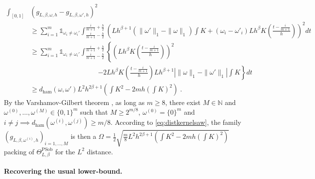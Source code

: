 \documentclass[10pt]{article} %
\def\Ind{\mathds{1}}
\newcommand{\N}[0]{\mathbb{N}}
\newcommand\ham[2]{d_\mathrm{ham}\left( {#1}, {#2} \right)}
\newcommand\p[1]{\left( {#1}\right)}
\newcommand\RG[1]{\textcolor{red}{#1}}
\begin{document}
\begin{equation}
\label{eq:distkernelsaw}
\begin{aligned}
    \int_{[0, 1]} &\p{g_{L, \beta, \omega, h} - g_{L, \beta, \omega', h}}^2 \\
    &\geq
    \sum_{i=1}^m \Ind_{\omega_i \neq \omega_i'} \int_{\frac{i}{m+1} - \frac{h}{2}}^{\frac{i}{m+1} + \frac{h}{2}}
    \p{L h^{\beta + 1} \p{\| \omega' \|_1 - \| \omega \|_1} \int K +(\omega_i-\omega'_i) L h^{\beta } K\p{\frac{t-\frac{i}{m+1} }{h}}}^2 dt\\
    &\geq
    \sum_{i=1}^m \Ind_{\omega_i \neq \omega_i'} \int_{\frac{i}{m+1} - \frac{h}{2}}^{\frac{i}{m+1} + \frac{h}{2}}
    \left\{\p{L h^{\beta } K\p{\frac{t-\frac{i}{m+1}}{h}}}^2 \right.\\
    &\quad\quad\quad\quad\quad\quad\quad\quad\quad\quad \left.- 2 L h^{\beta } K\p{\frac{t-\frac{i}{m+1}}{h}} L h^{\beta + 1} \left|\| \omega \|_1 - \| \omega' \|_1\right| \int K \right\} dt\\ 
    &\geq
    \ham{\omega}{\omega '} L^2h^{2 \beta + 1}\p{  \int K^2 - 2m h \p{\int K}^2} \;.
\end{aligned}
\end{equation}
By the Varshamov-Gilbert theorem \citep[Lemma 2.7]{tsybakov2003introduction}, as long as $m \geq 8$, there exist $M \in \N$ and $\omega^{(0)}, \dots, \omega^{(M)} \in \{ 0, 1 \}^m$ such that $M \geq 2^{m/8}$, $\omega^{(0)} = \{0\}^m$ and $i \neq j \implies \ham{\omega^{(i)}}{\omega^{(j)}} \geq m/8$. According to \eqref{eq:distkernelsaw}, the family $\p{g_{L, \beta, \omega^{(i)}, h}}_{i=1, \dots, M}$ is then a $\Omega = \frac{1}{2} \sqrt{\frac{m}{8}  L^2 h^{2 \beta + 1} \p{ \int K^2 - 2m h \p{\int K}^2}}$ packing of $\Theta^{\text{PSob}}_{L, \beta}$ for the $L^2$ distance.

\paragraph{Recovering the usual lower-bound.}
\end{document}
